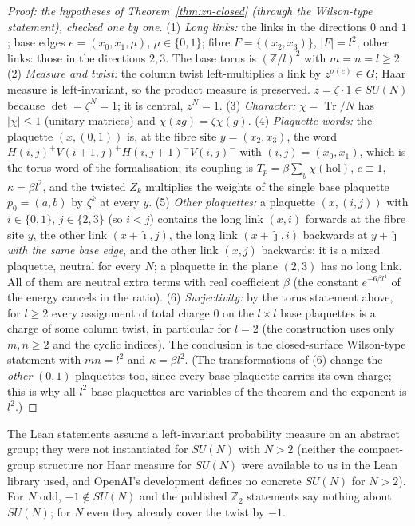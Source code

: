 \documentclass[11pt,a4paper]{article}
\theoremstyle{plain}
\theoremstyle{definition}
\theoremstyle{remark}
\numberwithin{equation}{section}
\begin{document}
\begin{proof}[Proof: the hypotheses of Theorem~\ref{thm:zn-closed} (through the Wilson-type statement), checked one by one]
(1) \emph{Long links:} the links in the directions $0$ and $1$; base edges $e=(x_0,x_1,\mu)$, $\mu\in\{0,1\}$; fibre $F=\{(x_2,x_3)\}$, $|F|=l^2$; other links: those in the directions $2,3$. The base torus is $(\mathbb Z/l)^2$ with $m=n=l\ge2$. (2) \emph{Measure and twist:} the column twist left-multiplies a link by $z^{\sigma(e)}\in G$; Haar measure is left-invariant, so the product measure is preserved. $z=\zeta\cdot1\in SU(N)$ because $\det=\zeta^N=1$; it is central, $z^N=1$. (3) \emph{Character:} $\chi=\operatorname{Tr}/N$ has $|\chi|\le1$ (unitary matrices) and $\chi(zg)=\zeta\chi(g)$. (4) \emph{Plaquette words:} the plaquette $(x,(0,1))$ is, at the fibre site $y=(x_2,x_3)$, the word $H(i,j)^+V(i{+}1,j)^+H(i,j{+}1)^-V(i,j)^-$ with $(i,j)=(x_0,x_1)$, which is the torus word of the formalisation; its coupling is $T_p=\beta\sum_y\chi(\mathrm{hol})$, $c\equiv1$, $\kappa=\beta l^2$, and the twisted $Z_k$ multiplies the weights of the single base plaquette $p_0=(a,b)$ by $\zeta^k$ at every $y$. (5) \emph{Other plaquettes:} a plaquette $(x,(i,j))$ with $i\in\{0,1\}$, $j\in\{2,3\}$ (so $i<j$) contains the long link $(x,i)$ forwards at the fibre site $y$, the other link $(x{+}\hat\imath,j)$, the long link $(x{+}\hat\jmath,i)$ backwards at $y{+}\hat\jmath$ \emph{with the same base edge}, and the other link $(x,j)$ backwards: it is a mixed plaquette, neutral for every $N$; a plaquette in the plane $(2,3)$ has no long link. All of them are neutral extra terms with real coefficient $\beta$ (the constant $e^{-6\beta l^4}$ of the energy cancels in the ratio). (6) \emph{Surjectivity:} by the torus statement above, for $l\ge2$ every assignment of total charge $0$ on the $l\times l$ base plaquettes is a charge of some column twist, in particular for $l=2$ (the construction uses only $m,n\ge2$ and the cyclic indices). The conclusion is the closed-surface Wilson-type statement with $mn=l^2$ and $\kappa=\beta l^2$. (The transformations of (6) change the \emph{other} $(0,1)$-plaquettes too, since every base plaquette carries its own charge; this is why all $l^2$ base plaquettes are variables of the theorem and the exponent is $l^2$.)
\end{proof}
The Lean statements assume a left-invariant probability measure on an abstract group; they were not instantiated for $SU(N)$ with $N>2$ (neither the compact-group structure nor Haar measure for $SU(N)$ were available to us in the Lean library used, and OpenAI's development defines no concrete $SU(N)$ for $N>2$). For $N$ odd, $-1\notin SU(N)$ and the published $\mathbb Z_2$ statements say nothing about $SU(N)$; for $N$ even they already cover the twist by $-1$.
\end{document}
